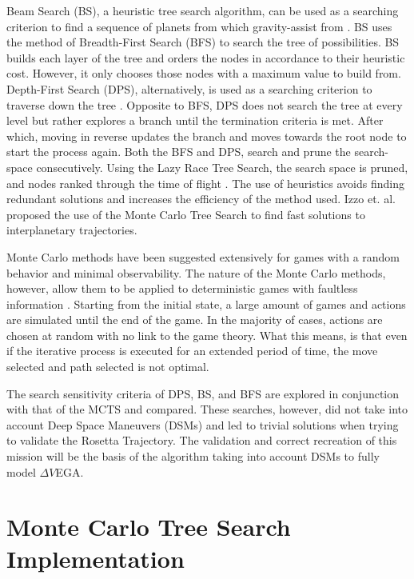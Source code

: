 \documentclass[letterpaper, preprint, paper,11pt]{AAS}	%
\begin{document}
Beam Search (BS), a heuristic tree search algorithm, can be used as a searching criterion to find a sequence of planets from which gravity-assist from \cite{Penas2019}. BS uses the method of Breadth-First Search (BFS) to search the tree of possibilities. BS builds each layer of the tree and orders the nodes in accordance to their heuristic cost. However, it only chooses those nodes with a maximum value to build from. Depth-First Search (DPS), alternatively, is used as a searching criterion to traverse down the tree \cite{Izzo2013}. Opposite to BFS, DPS does not search the tree at every level but rather explores a branch until the termination criteria is met. After which, moving in reverse updates the branch and moves towards the root node to start the process again. Both the BFS and DPS, search and prune the search- space consecutively. Using the Lazy Race Tree Search, the search space is pruned, and nodes ranked through the time of flight \cite{Izzo2013}. The use of heuristics avoids finding redundant solutions and increases the efficiency of the method used. Izzo et. al. \cite{Hennes2015} proposed the use of the Monte Carlo Tree Search to find fast solutions to interplanetary trajectories.  

Monte Carlo methods have been suggested extensively for games with a random behavior and minimal observability. The nature of the Monte Carlo methods, however, allow them to be applied to deterministic games with faultless information \cite{Browne2012}. Starting from the initial state, a large amount of games and actions are simulated until the end of the game. In the majority of cases, actions are chosen at random with no link to the game theory. What this means, is that even if the iterative process is executed for an extended period of time, the move selected and path selected is not optimal.  

The search sensitivity criteria of DPS, BS, and BFS are explored in conjunction with that of the MCTS and compared. These searches, however, did not take into account Deep Space Maneuvers (DSMs) and led to trivial solutions when trying to validate the Rosetta Trajectory. The validation and correct recreation of this mission will be the basis of the algorithm taking into account DSMs to fully model $\Delta V$EGA. 

\section{Monte Carlo Tree Search Implementation}
\end{document}
